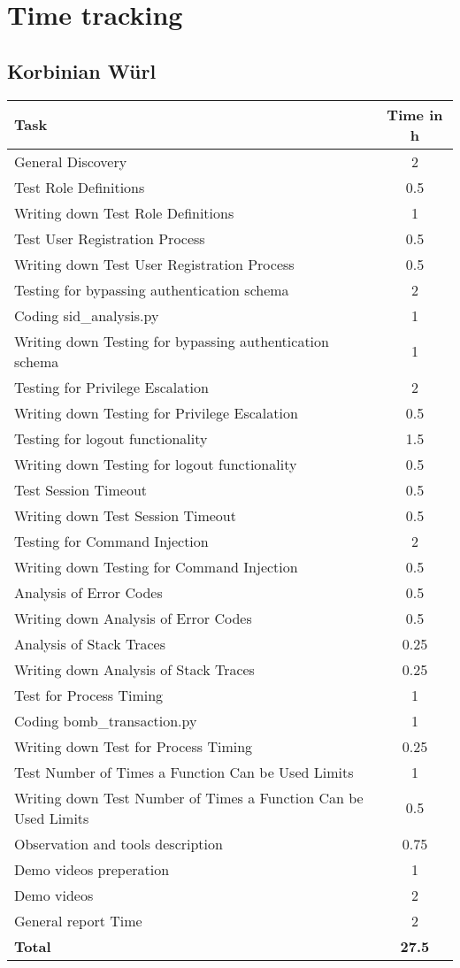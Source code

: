 \chapter{Time tracking}

\section{Korbinian Würl}
\begin{table}[H]
\tiny
\begin{tabular*}{\textwidth}{@{\extracolsep{\fill}} l c@{\extracolsep{0pt}} }
\textbf{Task} & \textbf{Time in h} \\ \hline
	General Discovery							& 2 \\
	Test Role Definitions						& 0.5\\
	Writing down Test Role Definitions			& 1\\
	Test User Registration Process				& 0.5\\
	Writing down Test User Registration Process	& 0.5\\
	Testing for bypassing authentication schema & 2\\
	Coding sid\_analysis.py 					& 1 \\
	Writing down Testing for bypassing authentication schema & 1 \\
	Testing for Privilege Escalation			& 2\\
	Writing down Testing for Privilege Escalation & 0.5\\
	Testing for logout functionality			& 1.5\\
	Writing down Testing for logout functionality & 0.5 \\
	Test Session Timeout						& 0.5 \\
	Writing down Test Session Timeout			& 0.5 \\
	Testing for Command Injection 				& 2 \\
	Writing down Testing for Command Injection 	& 0.5 \\
	Analysis of Error Codes	   					& 0.5\\
	Writing down Analysis of Error Codes	   	& 0.5 \\
	Analysis of Stack Traces 					& 0.25\\
	Writing down Analysis of Stack Traces 		& 0.25 \\
	Test for Process Timing 					& 1 \\
	Coding bomb\_transaction.py 				& 1 \\
	Writing down Test for Process Timing 		& 0.25 \\
	Test Number of Times a Function Can be Used Limits & 1 \\
	Writing down Test Number of Times a Function Can be Used Limits & 0.5 \\
	Observation and tools description			& 0.75 \\
	Demo videos	preperation						& 1 \\
	Demo videos									& 2 \\
	General report Time							& 2 \\
\hline\hline
\textbf{Total}									& \textbf{27.5}
\end{tabular*}
\end{table}
\clearpage

